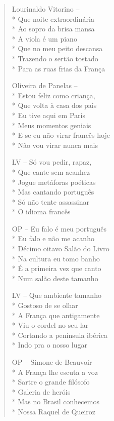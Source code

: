 \begin{verse}
Lourinaldo Vitorino --\\*
Que noite extraordinária\\*
Ao sopro da brisa mansa\\*
A viola é um piano\\*
Que no meu peito descansa\\*
Trazendo o sertão tostado\\*
Para as ruas frias da França

Oliveira de Panelas --\\*
Estou feliz como criança,\\*
Que volta à casa dos pais\\*
Eu tive aqui em Paris\\*
Meus momentos geniais\\*
E se eu não virar francês hoje\\*
Não vou virar nunca mais

LV -- Só vou pedir, rapaz,\\*
Que cante sem acanhez\\*
Jogue metáforas poéticas\\*
Mas cantando português\\*
Só não tente assassinar\\*
O idioma francês

OP -- Eu falo é meu português\\*
Eu falo e não me acanho\\*
Décimo oitavo Salão do Livro\\*
Na cultura eu tomo banho\\*
É a primeira vez que canto\\*
Num salão deste tamanho

LV -- Que ambiente tamanho\\*
Gostoso de se olhar\\*
A França que antigamente\\*
Viu o cordel no seu lar\\*
Cortando a península ibérica\\*
Indo pra o nosso lugar

OP -- Simone de Beauvoir\\*
A França lhe escuta a voz\\*
Sartre o grande filósofo\\*
Galeria de heróis\\*
Mas no Brasil conhecemos\\*
Nossa Raquel de Queiroz


\end{verse}
